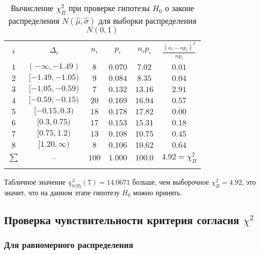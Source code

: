 \documentclass[12pt]{article}
\begin{document}
\begin{flushleft}
	\begin{table}[h]
		\begin{center}
			\caption{Вычисление $\chi^2_B$ при проверке гипотезы $H_0$ о законе распределения $N(\hat{\mu}, \hat{\sigma})$ для выборки распределения $N(0, 1)$}
			\begin{tabular}{||c|*{4}{c|}c||} \hhline{|t:=:=:=:=:=:=:t|}
				$i$    & $\Delta_i$         & $n_i$ & $p_i$   & $n_ip_i$ & $\frac{(n_i-np_i)^2}{np_i}$ \\
				\hhline{|:=:=:=:=:=:=:|}
				$1$    & $(-\infty, -1.49)$ & $8$   & $0.070$ & $7.02$   & $0.01$ \\
				\hhline{||-|-|-|-|-|-||}
				$2$    & $[-1.49, -1.05)$   & $9$   & $0.084$ & $8.35$   & $0.04$ \\
				\hhline{||-|-|-|-|-|-||}
				$3$    & $[-1.05, -0.59)$   & $7$   & $0.132$ & $13.16$  & $2.91$ \\
				\hhline{||-|-|-|-|-|-||}
				$4$    & $[-0.59, -0.15)$   & $20$  & $0.169$ & $16.94$  & $0.57$ \\
				\hhline{||-|-|-|-|-|-||}
				$5$    & $[-0.15, 0.3)$     & $18$  & $0.178$ & $17.82$  & $0.00$ \\
				\hhline{||-|-|-|-|-|-||}
				$6$    & $[0.3, 0.75)$      & $17$  & $0.153$ & $15.31$  & $0.18$ \\
				\hhline{||-|-|-|-|-|-||}
				$7$    & $[0.75, 1.2)$      & $13$  & $0.108$ & $10.75$  & $0.45$ \\
				\hhline{||-|-|-|-|-|-||}
				$8$    & $[1.20, \infty)$   & $8$   & $0.106$ & $10.62$  & $0.64$ \\
				\hhline{|:=:=:=:=:=:=:|}
				$\sum$ & --                 & $100$ & $1.000$ & $100.0$  & $4.92 = \chi^2_B$ \\
				\hhline{|b:=:=:=:=:=:=:b|}
			\end{tabular}
		\label{chi_normal}
		\end{center}
	\end{table}

	Табличное значение $\chi^2_{0.95}(7) = 14.0671$ больше, чем выборочное $\chi^2_B = 4.92$, это значит, что на данном этапе гипотезу $H_0$ можно принять.

	\subsection{Проверка чувствительности критерия согласия $\chi^2$}

		\subsubsection{Для равномерного распределения}


\end{flushleft}
\end{document}
